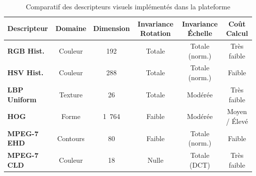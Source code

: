 \begin{table}[H]
    \centering
    \small
    \caption{Comparatif des descripteurs visuels implémentés dans la plateforme}
    \label{tab:comparatif_descripteurs}
    \begin{tabular}{lccccc}
        \toprule
        \textbf{Descripteur} & \textbf{Domaine} & \textbf{Dimension} & \textbf{Invariance Rotation} & \textbf{Invariance Échelle} & \textbf{Coût Calcul} \\
        \midrule
        \textbf{RGB Hist.}   & Couleur  & 192   & Totale  & Totale (norm.) & Très faible \\
        \textbf{HSV Hist.}   & Couleur  & 288   & Totale  & Totale (norm.) & Faible \\
        \textbf{LBP Uniform} & Texture  & 26    & Totale  & Modérée        & Très faible \\
        \textbf{HOG}         & Forme    & 1~764 & Faible  & Modérée        & Moyen / Élevé \\
        \textbf{MPEG-7 EHD}  & Contours & 80    & Faible  & Totale (norm.) & Faible \\
        \textbf{MPEG-7 CLD}  & Couleur  & 18    & Nulle   & Totale (DCT)   & Très faible \\
        \bottomrule
    \end{tabular}
\end{table}
